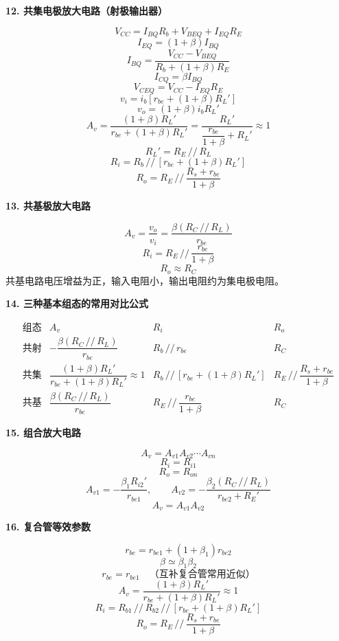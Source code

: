 \documentclass[12pt]{article}
\newcommand{\sectionbox}[1]{%
  \vspace{4pt}
  {\Large\bfseries\color{accent}#1}\par
  \vspace{2pt}
}
\newcommand{\note}[1]{{\color{muted}\small #1}}
\newcommand{\pp}{\,/ /\,}
\begin{document}
\sectionbox{12. 共集电极放大电路（射极输出器）}

\begin{tcolorbox}
\[
V_{CC}=I_{BQ}R_b+V_{BEQ}+I_{EQ}R_E
\]
\[
I_{EQ}=(1+\beta)I_{BQ}
\]
\[
I_{BQ}=\frac{V_{CC}-V_{BEQ}}{R_b+(1+\beta)R_E}
\]
\[
I_{CQ}=\beta I_{BQ}
\]
\[
V_{CEQ}=V_{CC}-I_{EQ}R_E
\]
\[
v_i=i_b\left[r_{be}+(1+\beta)R_L'\right]
\]
\[
v_o=(1+\beta)i_bR_L'
\]
\[
A_v=\frac{(1+\beta)R_L'}
{r_{be}+(1+\beta)R_L'}
=\frac{R_L'}{\dfrac{r_{be}}{1+\beta}+R_L'}\approx 1
\]
\[
R_L'=R_E\pp R_L
\]
\[
R_i=R_b\pp\left[r_{be}+(1+\beta)R_L'\right]
\]
\[
R_o=R_E\pp\frac{R_s+r_{be}}{1+\beta}
\]
\end{tcolorbox}

\sectionbox{13. 共基极放大电路}

\begin{tcolorbox}
\[
A_v=\frac{v_o}{v_i}
=\frac{\beta(R_C\pp R_L)}{r_{be}}
\]
\[
R_i=R_E\pp\frac{r_{be}}{1+\beta}
\]
\[
R_o\approx R_C
\]
\note{共基电路电压增益为正，输入电阻小，输出电阻约为集电极电阻。}
\end{tcolorbox}

\sectionbox{14. 三种基本组态的常用对比公式}

\begin{tcolorbox}
\[
\begin{array}{c|c|c|c}
\text{组态} & A_v & R_i & R_o\\
\hline
\text{共射} &
-\dfrac{\beta(R_C\pp R_L)}{r_{be}} &
R_b\pp r_{be} &
R_C\\[10pt]
\text{共集} &
\dfrac{(1+\beta)R_L'}{r_{be}+(1+\beta)R_L'}\approx 1 &
R_b\pp\left[r_{be}+(1+\beta)R_L'\right] &
R_E\pp\dfrac{R_s+r_{be}}{1+\beta}\\[12pt]
\text{共基} &
\dfrac{\beta(R_C\pp R_L)}{r_{be}} &
R_E\pp\dfrac{r_{be}}{1+\beta} &
R_C
\end{array}
\]
\end{tcolorbox}

\sectionbox{15. 组合放大电路}

\begin{tcolorbox}
\[
A_v=A_{v1}A_{v2}\cdots A_{vn}
\]
\[
R_i=R_{i1}
\]
\[
R_o=R_{on}
\]
\[
A_{v1}=-\frac{\beta_1R_{i2}'}{r_{be1}},
\qquad
A_{v2}=-\frac{\beta_2(R_C\pp R_L)}{r_{be2}+R_E'}
\]
\[
A_v=A_{v1}A_{v2}
\]
\end{tcolorbox}

\sectionbox{16. 复合管等效参数}

\begin{tcolorbox}
\[
r_{be}=r_{be1}+(1+\beta_1)r_{be2}
\]
\[
\beta\simeq \beta_1\beta_2
\]
\[
r_{be}=r_{be1}
\quad\text{（互补复合管常用近似）}
\]
\[
A_v=\frac{(1+\beta)R_L'}
{r_{be}+(1+\beta)R_L'}\approx 1
\]
\[
R_i=R_{b1}\pp R_{b2}\pp\left[r_{be}+(1+\beta)R_L'\right]
\]
\[
R_o=R_E\pp\frac{R_s+r_{be}}{1+\beta}
\]
\end{tcolorbox}
\end{document}
